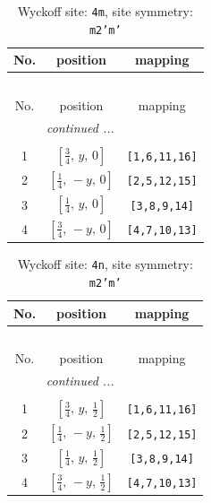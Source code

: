 \documentclass[fleqn,8pt]{jsarticle}
\begin{document}
\renewcommand{\arraystretch}{1.2}
\begin{longtable}{ccc}
\caption{Wyckoff site: {\tt 4m}, site symmetry: {\tt m2'm'}}
 \\
 \hline \hline
No. & position & mapping \\ \hline \endfirsthead

\multicolumn{2}{l}{\tablename\ \thetable{}} \\
 \hline \hline
No. & position & mapping \\ \hline \endhead

 \hline \hline
\multicolumn{2}{r}{\footnotesize\it continued ...} \\ \endfoot

 \hline \hline
\multicolumn{2}{r}{} \\ \endlastfoot

1 & $\left[ \frac{3}{4},\, y,\, 0 \right]$ & {\tt [1,6,11,16]} \\ \hline
2 & $\left[ \frac{1}{4},\, - y,\, 0 \right]$ & {\tt [2,5,12,15]} \\ \hline
3 & $\left[ \frac{1}{4},\, y,\, 0 \right]$ & {\tt [3,8,9,14]} \\ \hline
4 & $\left[ \frac{3}{4},\, - y,\, 0 \right]$ & {\tt [4,7,10,13]} \\
\end{longtable}
\renewcommand{\arraystretch}{1.2}
\begin{longtable}{ccc}
\caption{Wyckoff site: {\tt 4n}, site symmetry: {\tt m2'm'}}
 \\
 \hline \hline
No. & position & mapping \\ \hline \endfirsthead

\multicolumn{2}{l}{\tablename\ \thetable{}} \\
 \hline \hline
No. & position & mapping \\ \hline \endhead

 \hline \hline
\multicolumn{2}{r}{\footnotesize\it continued ...} \\ \endfoot

 \hline \hline
\multicolumn{2}{r}{} \\ \endlastfoot

1 & $\left[ \frac{3}{4},\, y,\, \frac{1}{2} \right]$ & {\tt [1,6,11,16]} \\ \hline
2 & $\left[ \frac{1}{4},\, - y,\, \frac{1}{2} \right]$ & {\tt [2,5,12,15]} \\ \hline
3 & $\left[ \frac{1}{4},\, y,\, \frac{1}{2} \right]$ & {\tt [3,8,9,14]} \\ \hline
4 & $\left[ \frac{3}{4},\, - y,\, \frac{1}{2} \right]$ & {\tt [4,7,10,13]} \\
\end{longtable}
\end{document}
